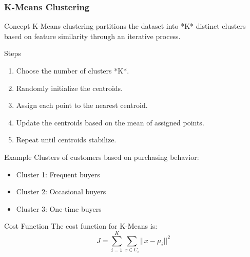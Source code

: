 \documentclass[aspectratio=169]{beamer}
\begin{document}
\begin{frame}[fragile]
    \frametitle{K-Means Clustering}
    \begin{block}{Concept}
        K-Means clustering partitions the dataset into *K* distinct clusters based on feature similarity through an iterative process.
    \end{block}
    
    \begin{block}{Steps}
        \begin{enumerate}
            \item Choose the number of clusters *K*.
            \item Randomly initialize the centroids.
            \item Assign each point to the nearest centroid.
            \item Update the centroids based on the mean of assigned points.
            \item Repeat until centroids stabilize.
        \end{enumerate}
    \end{block}
    
    \begin{block}{Example}
        Clusters of customers based on purchasing behavior:
        \begin{itemize}
            \item Cluster 1: Frequent buyers
            \item Cluster 2: Occasional buyers
            \item Cluster 3: One-time buyers
        \end{itemize}
    \end{block}
    
    \begin{block}{Cost Function}
        The cost function for K-Means is:
        \begin{equation}
            J = \sum_{i=1}^{K} \sum_{x \in C_i} || x - \mu_i ||^2
        \end{equation}
    \end{block}
\end{frame}
\end{document}
